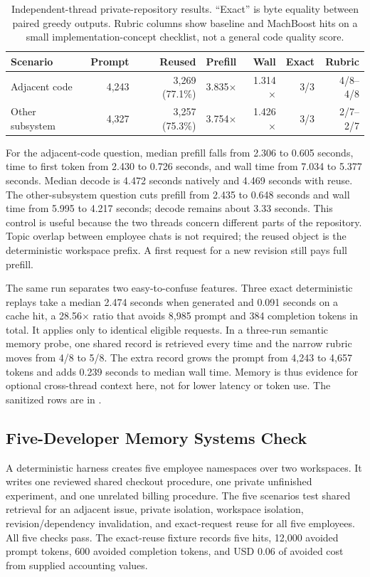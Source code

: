 \documentclass[11pt]{article}
\begin{document}
\begin{table}[H]
\centering
\small
\begin{tabular}{lrrrrrr}
\toprule
Scenario & Prompt & Reused & Prefill & Wall & Exact & Rubric \\
\midrule
Adjacent code & 4,243 & 3,269 (77.1\%) & 3.835$\times$ & 1.314$\times$ & 3/3 & 4/8--4/8 \\
Other subsystem & 4,327 & 3,257 (75.3\%) & 3.754$\times$ & 1.426$\times$ & 3/3 & 2/7--2/7 \\
\bottomrule
\end{tabular}
\caption{Independent-thread private-repository results. ``Exact'' is byte
equality between paired greedy outputs. Rubric columns show baseline and
MachBoost hits on a small implementation-concept checklist, not a general code
quality score.}
\label{tab:privaterepo}
\end{table}

For the adjacent-code question, median prefill falls from 2.306 to 0.605
seconds, time to first token from 2.430 to 0.726 seconds, and wall time from
7.034 to 5.377 seconds. Median decode is 4.472 seconds natively and 4.469
seconds with reuse. The other-subsystem question cuts prefill from 2.435 to
0.648 seconds and wall time from 5.995 to 4.217 seconds; decode remains about
3.33 seconds. This control is useful because the two threads concern different
parts of the repository. Topic overlap between employee chats is not required;
the reused object is the deterministic workspace prefix. A first request for a
new revision still pays full prefill.

The same run separates two easy-to-confuse features. Three exact deterministic
replays take a median 2.474 seconds when generated and 0.091 seconds on a cache
hit, a 28.56$\times$ ratio that avoids 8,985 prompt and 384 completion tokens in
total. It applies only to identical eligible requests. In a three-run semantic
memory probe, one shared record is retrieved every time and the narrow rubric
moves from 4/8 to 5/8. The extra record grows the prompt from 4,243 to 4,657
tokens and adds 0.239 seconds to median wall time. Memory is thus evidence for
optional cross-thread context here, not for lower latency or token use. The
sanitized rows are in
.

\subsection{Five-Developer Memory Systems Check}
A deterministic harness creates five employee namespaces over two workspaces.
It writes one reviewed shared checkout procedure, one private unfinished
experiment, and one unrelated billing procedure. The five scenarios test shared
retrieval for an adjacent issue, private isolation, workspace isolation,
revision/dependency invalidation, and exact-request reuse for all five
employees. All five checks pass. The exact-reuse fixture records five hits,
12,000 avoided prompt tokens, 600 avoided completion tokens, and USD 0.06 of
avoided cost from supplied accounting values.
\end{document}

